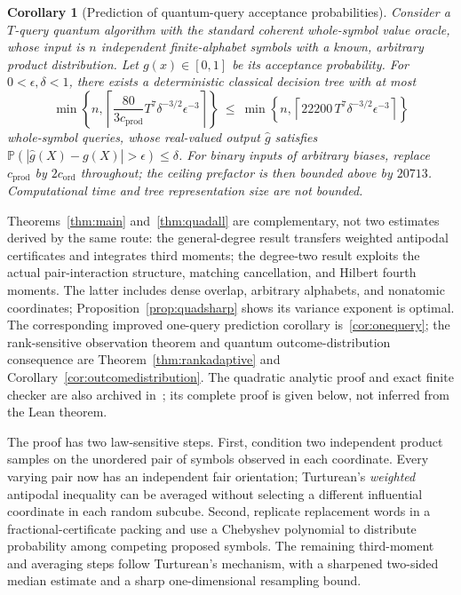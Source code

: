 \documentclass[11pt]{article}
\numberwithin{equation}{section}
\newtheorem{corollary}[theorem]{Corollary}
\theoremstyle{remark}
\newcommand{\Prb}{\mathbb P}
\newcommand{\cprod}{c_{\mathrm{prod}}}
\newcommand{\cord}{c_{\mathrm{ord}}}
\begin{document}
\begin{corollary}[Prediction of quantum-query acceptance probabilities]\label{cor:quantum}
Consider a $T$-query quantum algorithm with the standard coherent whole-symbol value oracle, whose input is $n$ independent finite-alphabet symbols with a known, arbitrary product distribution. Let $g(x)\in[0,1]$ be its acceptance probability. For $0<\epsilon,\delta<1$, there exists a deterministic classical decision tree with at most
\begin{equation}\label{eq:quantum}
 \min\left\{n,\left\lceil\frac{80}{3\cprod}
 T^7\delta^{-3/2}\epsilon^{-3}\right\rceil\right\}
 \ \le\ \min\left\{n,\left\lceil 22200\,T^7\delta^{-3/2}\epsilon^{-3}\right\rceil\right\}
\end{equation}
whole-symbol queries, whose real-valued output $\widehat g$ satisfies
$\Prb(|\widehat g(X)-g(X)|>\epsilon)\le\delta$.
For binary inputs of arbitrary biases, replace $\cprod$ by $2\cord$ throughout; the ceiling prefactor is then bounded above by $20713$. Computational time and tree representation size are not bounded.
\end{corollary}

Theorems~\ref{thm:main} and~\ref{thm:quadall} are complementary, not two estimates derived by the same route: the general-degree result transfers weighted antipodal certificates and integrates third moments; the degree-two result exploits the actual pair-interaction structure, matching cancellation, and Hilbert fourth moments. The latter includes dense overlap, arbitrary alphabets, and nonatomic coordinates; Proposition~\ref{prop:quadsharp} shows its variance exponent is optimal. The corresponding improved one-query prediction corollary is~\ref{cor:onequery}; the rank-sensitive observation theorem and quantum outcome-distribution consequence are Theorem~\ref{thm:rankadaptive} and Corollary~\ref{cor:outcomedistribution}. The quadratic analytic proof and exact finite checker are also archived in~\cite{WriQuad26}; its complete proof is given below, not inferred from the Lean theorem.

The proof has two law-sensitive steps. First, condition two independent product samples on the unordered pair of symbols observed in each coordinate. Every varying pair now has an independent fair orientation; Turturean's \emph{weighted} antipodal inequality can be averaged without selecting a different influential coordinate in each random subcube. Second, replicate replacement words in a fractional-certificate packing and use a Chebyshev polynomial to distribute probability among competing proposed symbols. The remaining third-moment and averaging steps follow Turturean's mechanism, with a sharpened two-sided median estimate and a sharp one-dimensional resampling bound.
\end{document}
